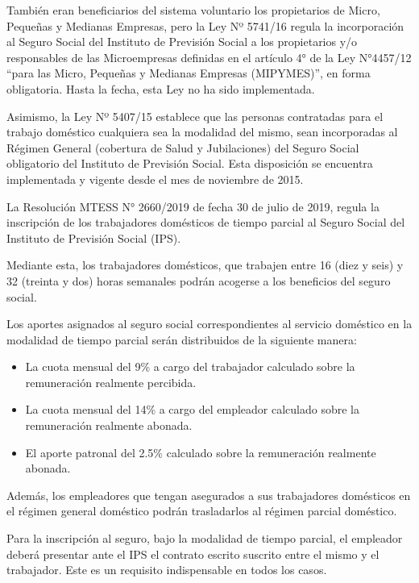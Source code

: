 También eran beneficiarios del sistema voluntario los propietarios de Micro, Pequeñas y Medianas Empresas, pero la Ley Nº 5741/16 regula la incorporación al Seguro Social del Instituto de Previsión Social a los propietarios y/o responsables de las Microempresas definidas en el artículo 4° de la Ley N°4457/12 “para las Micro, Pequeñas y Medianas Empresas (MIPYMES)”, en forma obligatoria. Hasta la fecha, esta Ley no ha sido implementada.

Asimismo, la Ley Nº 5407/15 establece que las personas contratadas para el trabajo doméstico cualquiera sea la modalidad del mismo, sean incorporadas al Régimen General (cobertura de Salud y Jubilaciones) del Seguro Social obligatorio del Instituto de Previsión Social. Esta disposición se encuentra implementada y vigente desde el mes de noviembre de 2015.

La Resolución MTESS N° 2660/2019 de fecha 30 de julio de 2019, regula la inscripción de los trabajadores domésticos de tiempo parcial al Seguro Social del Instituto de Previsión Social (IPS)\cite{}.

Mediante esta, los trabajadores domésticos, que trabajen entre 16 (diez y seis) y 32 (treinta y dos) horas semanales podrán acogerse a los beneficios del seguro social.

Los aportes asignados al seguro social correspondientes al servicio doméstico en la modalidad de tiempo parcial serán distribuidos de la siguiente manera: 

\begin {itemize}

\item La cuota mensual del 9\% a cargo del trabajador calculado sobre la remuneración realmente percibida.

\item La cuota mensual del 14\% a cargo del empleador calculado sobre la remuneración realmente abonada.

\item El aporte patronal del 2.5\% calculado sobre la remuneración realmente abonada.

\end{itemize}

Además, los empleadores que tengan asegurados a sus trabajadores domésticos en el régimen general doméstico podrán trasladarlos al régimen parcial doméstico.

Para la inscripción al seguro, bajo la modalidad de tiempo parcial, el empleador deberá presentar ante el IPS el contrato escrito suscrito entre el mismo y el trabajador. Este es un requisito indispensable en todos los casos.

